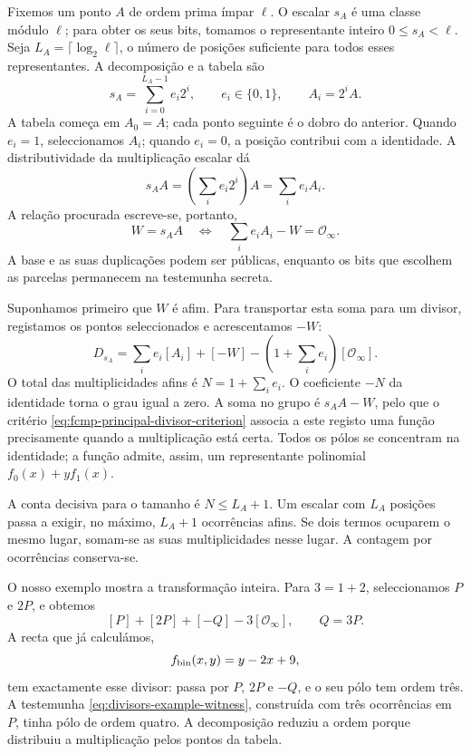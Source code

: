 Fixemos um ponto \(A\) de ordem prima ímpar \(\ell\). O escalar
\(s_A\) é uma classe módulo \(\ell\); para obter os seus bits,
tomamos o representante inteiro \(0\leq s_A<\ell\). Seja
\(L_A=\lceil\log_2\ell\rceil\), o número de posições suficiente
para todos esses representantes. A decomposição e a tabela são
\begin{equation}
 s_A=\sum_{i=0}^{L_A-1}e_i2^i,
 \qquad e_i\in\{0,1\},\qquad A_i=2^iA.
 \label{eq:fcmp-scalar-decomposition}
\end{equation}
A tabela começa em \(A_0=A\); cada ponto seguinte é o dobro do
anterior. Quando \(e_i=1\), seleccionamos \(A_i\); quando
\(e_i=0\), a posição contribui com a identidade. A distributividade
da multiplicação escalar dá
\[
 s_AA=\left(\sum_i e_i2^i\right)A=\sum_i e_iA_i.
\]
A relação procurada escreve-se, portanto,
\begin{equation}
 W=s_AA\quad\Longleftrightarrow\quad
 \sum_i e_iA_i-W=\mathcal O_\infty.
 \label{eq:fcmp-hidden-scalar-multiplication}
\end{equation}
A base e as suas duplicações podem ser públicas, enquanto os bits que
escolhem as parcelas permanecem na testemunha secreta.

Suponhamos primeiro que \(W\) é afim. Para transportar esta soma
para um divisor, registamos os pontos seleccionados e acrescentamos
\(-W\):
\begin{equation}
 D_{s_A}=\sum_i e_i[A_i]+[-W]
       -\left(1+\sum_i e_i\right)[\mathcal O_\infty].
 \label{eq:fcmp-dlog-divisor}
\end{equation}
O total das multiplicidades afins é
\(N=1+\sum_i e_i\). O coeficiente \(-N\) da identidade torna
o grau igual a zero. A soma no grupo é \(s_AA-W\), pelo que o
critério \eqref{eq:fcmp-principal-divisor-criterion} associa a este
registo uma função precisamente quando a multiplicação está certa.
Todos os pólos se concentram na identidade; a função admite, assim,
um representante polinomial \(f_0(x)+yf_1(x)\).

A conta decisiva para o tamanho é \(N\leq L_A+1\). Um escalar
com \(L_A\) posições passa a exigir, no máximo, \(L_A+1\)
ocorrências afins. Se dois termos ocuparem o mesmo lugar, somam-se
as suas multiplicidades nesse lugar. A contagem por ocorrências
conserva-se.

O nosso exemplo mostra a transformação inteira. Para \(3=1+2\),
seleccionamos \(P\) e \(2P\), e obtemos
\[
 [P]+[2P]+[-Q]-3[\mathcal O_\infty],\qquad Q=3P.
\]
A recta que já calculámos,
\[
 f_{\rm bin}(x,y)=y-2x+9,
\]
tem exactamente esse divisor: passa por \(P\), \(2P\) e
\(-Q\), e o seu pólo tem ordem três. A testemunha
\eqref{eq:divisors-example-witness}, construída com três ocorrências
em \(P\), tinha pólo de ordem quatro. A decomposição reduziu a
ordem porque distribuiu a multiplicação pelos pontos da tabela.


